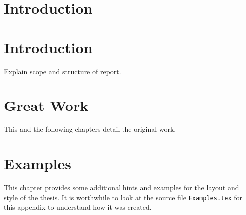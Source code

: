 \documentclass[11pt,a4paper]{book}
\begin{document}
\nocite{*}

\frontmatter


\chapter*{Introduction}



\tableofcontents

\mainmatter
\chapter{Introduction}
\label{s:Introduction}
Explain scope and structure of report.

\chapter{Great Work}
\label{s:GreatWork}

This and the following chapters detail the original work.

\chapter{Examples}
\label{s:Examples}

This chapter provides some additional hints and examples for the
layout and style of the thesis. It is worthwhile to look at the source
file \verb|Examples.tex| for this appendix to understand how it was
created.
\end{document}
